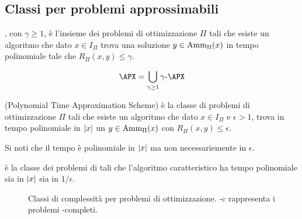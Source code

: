 \subsection{Classi per problemi approssimabili}

\begin{defin}[\gAPX{$\gamma$}]
	\gAPX{$\gamma$}, con $\gamma\geq1$, è l'insieme dei problemi di ottimizzazione $\Pi$ tali che esiste un algoritmo che dato $x\in I_\Pi$ trova una soluzione $y\in\mathrm{Amm}_\Pi(x)$ in tempo polinomiale tale che $R_\Pi(x,y)\leq \gamma$.
\end{defin}
\begin{defin}[\APX]
	\begin{equation*}
		\APX=\bigcup_{\gamma\geq1} \gAPX{\gamma}
	\end{equation*}
\end{defin}

\begin{defin}[\PTAS]
	\PTAS (Polynomial Time Approximation Scheme) è la classe di problemi di ottimizzazione $\Pi$ tali che esiste un algoritmo che dato $x\in I_\Pi$ e $\epsilon>1$, trova in tempo polinomiale in $|x|$ un $y\in\mathrm{Amm}_\Pi(x)$ con $R_\Pi(x,y)\leq\epsilon$.
\end{defin}
\noindent Si noti che il tempo è polinomiale in $|x|$ ma non necessariemente in $\epsilon$.
\begin{defin}[\FPTAS]
	\FPTAS è la classe dei problemi di \PTAS tali che l'algoritmo caratteristico ha tempo polinomiale sia in $|x|$ sia in $1/\epsilon$.
\end{defin}


\begin{figure}
	\centering
	
	\caption{Classi di complessità per problemi di ottimizzazione. \NPO-c rappresenta i problemi \NPO-completi.}
	\label{fig:compsets}
\end{figure}
